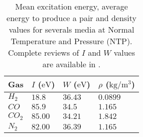 \begin{table}[ht]
	\centering
	\caption[Mean excitation energy, average energy to produce a pair and density values for severals media at Normal Temperature and Pressure (NTP)]
	{Mean excitation energy, average energy to produce a pair and density values for severals media at Normal Temperature and Pressure (NTP). Complete reviews of \(I\) and \(W\) values are available in \cite{Kamakura2006}\cite{Bichsel1979}.}
	\label{chap3:WandI}
	\begin{tabularx}{\linewidth}{XXXX}
		\toprule
		Gas        & \(I\) (\(\mathrm{eV}\)) & \(W\) (\(\mathrm{eV}\)) & \(\rho\) (\(\mathrm{kg/m^{3}}\)) \\
		\midrule
		\(H_{2}\)  & \(18.8\)                & \(36.43\)               & \(0.0899\)                       \\
		\(CO\)     & \(85.9\)                & \(34.5\)                & \(1.165\)                        \\
		\(CO_{2}\) & \(85.00\)               & \(34.21\)               & \(1.842\)                        \\
		\(N_{2}\)  & \(82.00\)               & \(36.39\)               & \(1.165\)                        \\
		\bottomrule
	\end{tabularx}
\end{table}